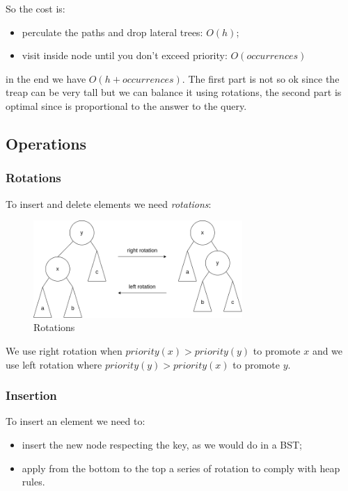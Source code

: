 So the cost is:
\begin{itemize}
    \item perculate the paths and drop lateral trees: $O(h)$;
    \item visit inside node until you don't exceed priority: $O(occurrences)$
\end{itemize}
in the end we have $O(h + occurrences)$.
The first part is not so ok since the treap can be very tall but we can balance it using rotations, the second part is optimal since is proportional to the answer to the query.

\subsection{Operations}
\subsubsection{Rotations}
To insert and delete elements we need \emph{rotations}:
\begin{figure}[H]
    \centering
    \includegraphics[width=300px]{images/4_Randomized_data_structures/treap_rotations.png}
    \caption{Rotations}
\end{figure}
We use right rotation when $priority(x) > priority(y)$ to promote $x$ and we use left rotation where $priority(y) > priority(x)$ to promote $y$.

\subsubsection{Insertion}
To insert an element we need to:
\begin{itemize}
    \item insert the new node respecting the key, as we would do in a BST;
    \item apply from the bottom to the top a series of rotation to comply with heap rules.
\end{itemize}

